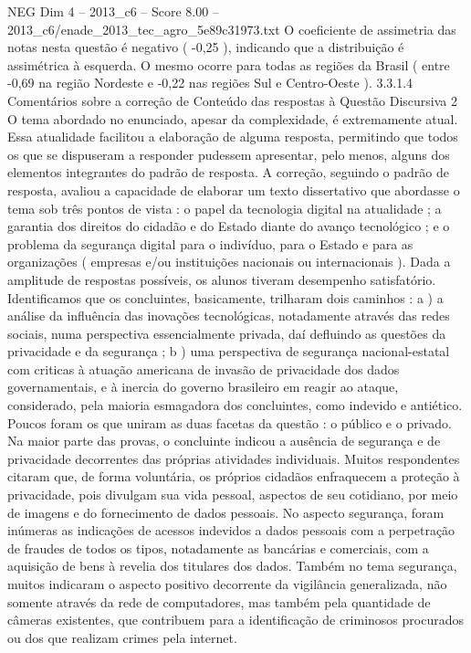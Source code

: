 \begin{textsample}{NEG Dim 4 – 2013\_c6 – Score 8.00 – 2013\_c6/enade\_2013\_tec\_agro\_5e89c31973.txt}
O coeficiente de assimetria das notas nesta questão é negativo ( -0,25 ), indicando que a distribuição é assimétrica à esquerda.
O mesmo ocorre para todas as regiões da Brasil ( entre -0,69 na região Nordeste e -0,22 nas regiões Sul e Centro-Oeste ). 3.3.1.4 Comentários sobre a correção de Conteúdo das respostas à Questão Discursiva 2 O tema abordado no enunciado, apesar da complexidade, é extremamente atual.
Essa atualidade facilitou a elaboração de alguma resposta, permitindo que todos os que se dispuseram a responder pudessem apresentar, pelo menos, alguns dos elementos integrantes do padrão de resposta.
A correção, seguindo o padrão de resposta, avaliou a capacidade de elaborar um texto dissertativo que abordasse o tema sob três pontos de vista : o papel da tecnologia digital na atualidade ; a garantia dos direitos do cidadão e do Estado diante do avanço tecnológico ; e o problema da segurança digital para o indivíduo, para o Estado e para as organizações ( empresas e/ou instituições nacionais ou internacionais ).
Dada a amplitude de respostas possíveis, os alunos tiveram desempenho satisfatório.
Identificamos que os concluintes, basicamente, trilharam dois caminhos : a ) a análise da influência das inovações tecnológicas, notadamente através das redes sociais, numa perspectiva essencialmente privada, daí defluindo as questões da privacidade e da segurança ; b ) uma perspectiva de segurança nacional-estatal com criticas à atuação americana de invasão de privacidade dos dados governamentais, e à inercia do governo brasileiro em reagir ao ataque, considerado, pela maioria esmagadora dos concluintes, como indevido e antiético.
Poucos foram os que uniram as duas facetas da questão : o público e o privado.
Na maior parte das provas, o concluinte indicou a ausência de segurança e de privacidade decorrentes das próprias atividades individuais.
Muitos respondentes citaram que, de forma voluntária, os próprios cidadãos enfraquecem a proteção à privacidade, pois divulgam sua vida pessoal, aspectos de seu cotidiano, por meio de imagens e do fornecimento de dados pessoais.
No aspecto segurança, foram inúmeras as indicações de acessos indevidos a dados pessoais com a perpetração de fraudes de todos os tipos, notadamente as bancárias e comerciais, com a aquisição de bens à revelia dos titulares dos dados.
Também no tema segurança, muitos indicaram o aspecto positivo decorrente da vigilância generalizada, não somente através da rede de computadores, mas também pela quantidade de câmeras existentes, que contribuem para a identificação de criminosos procurados ou dos que realizam crimes pela internet.

\end{textsample}
